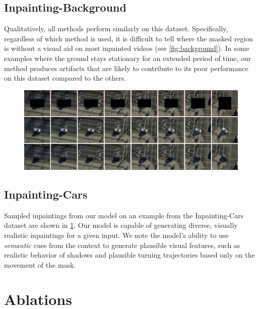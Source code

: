 \subsection{Inpainting-Background}
Qualitatively, all methods perform similarly on this dataset. Specifically, regardless of which method is used, it is difficult to tell where the masked region is without a visual aid on most inpainted videos (see \cref{fig:background}). In some examples where the ground stays stationary for an extended period of time, our method produces artifacts that are likely to contribute to its poor performance on this dataset
compared to the others. 
\begin{figure}[t]
\begin{center}
    \centering
    \captionsetup{type=figure}
    \includegraphics[width=\linewidth]{figures/updated-cars.pdf}
    \label{fig:cars}
\end{center}%
\end{figure}
\subsection{Inpainting-Cars}
Sampled inpaintings from our model on an example from the Inpainting-Cars dataset are shown in \cref{fig:cars}. Our model is capable of generating diverse, visually realistic inpaintings for a given input. We note the model's ability to use \emph{semantic} cues from the context to generate plausible visual features, such as realistic behavior of shadows and plausible turning trajectories based only on the movement of the mask.

\section{Ablations}

